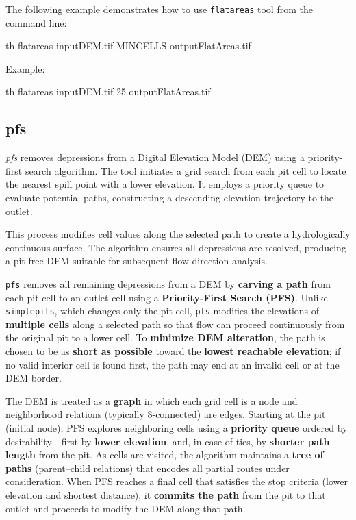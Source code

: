 \documentclass[
]{book}
\newenvironment{Shaded}{\begin{snugshade}}{\end{snugshade}}
\newcommand{\ExtensionTok}[1]{#1}
\newcommand{\NormalTok}[1]{#1}
\theoremstyle{definition}
\theoremstyle{definition}
\theoremstyle{definition}
\theoremstyle{definition}
\theoremstyle{remark}
\begin{document}
The following example demonstrates how to use \texttt{flatareas} tool from the command line:

\begin{Shaded}
\begin{Highlighting}[]
\ExtensionTok{th}\NormalTok{ flatareas inputDEM.tif MINCELLS outputFlatAreas.tif}
\end{Highlighting}
\end{Shaded}

Example:

\begin{Shaded}
\begin{Highlighting}[]
\ExtensionTok{th}\NormalTok{ flatareas inputDEM.tif 25 outputFlatAreas.tif}
\end{Highlighting}
\end{Shaded}

\subsection{pfs}\label{pfs}

\emph{pfs} removes depressions from a Digital Elevation Model (DEM) using a priority-first search algorithm. The tool initiates a grid search from each pit cell to locate the nearest spill point with a lower elevation. It employs a priority queue to evaluate potential paths, constructing a descending elevation trajectory to the outlet.

This process modifies cell values along the selected path to create a hydrologically continuous surface. The algorithm ensures all depressions are resolved, producing a pit-free DEM suitable for subsequent flow-direction analysis.

\texttt{pfs} removes all remaining depressions from a DEM by \textbf{carving a path} from each pit cell to an outlet cell using a \textbf{Priority-First Search (PFS)}. Unlike \texttt{simplepits}, which changes only the pit cell, \texttt{pfs} modifies the elevations of \textbf{multiple cells} along a selected path so that flow can proceed continuously from the original pit to a lower cell. To \textbf{minimize DEM alteration}, the path is chosen to be as \textbf{short as possible} toward the \textbf{lowest reachable elevation}; if no valid interior cell is found first, the path may end at an invalid cell or at the DEM border.

The DEM is treated as a \textbf{graph} in which each grid cell is a node and neighborhood relations (typically 8-connected) are edges. Starting at the pit (initial node), PFS explores neighboring cells using a \textbf{priority queue} ordered by desirability---first by \textbf{lower elevation}, and, in case of ties, by \textbf{shorter path length} from the pit. As cells are visited, the algorithm maintains a \textbf{tree of paths} (parent--child relations) that encodes all partial routes under consideration. When PFS reaches a final cell that satisfies the stop criteria (lower elevation and shortest distance), it \textbf{commits the path} from the pit to that outlet and proceeds to modify the DEM along that path.
\end{document}
